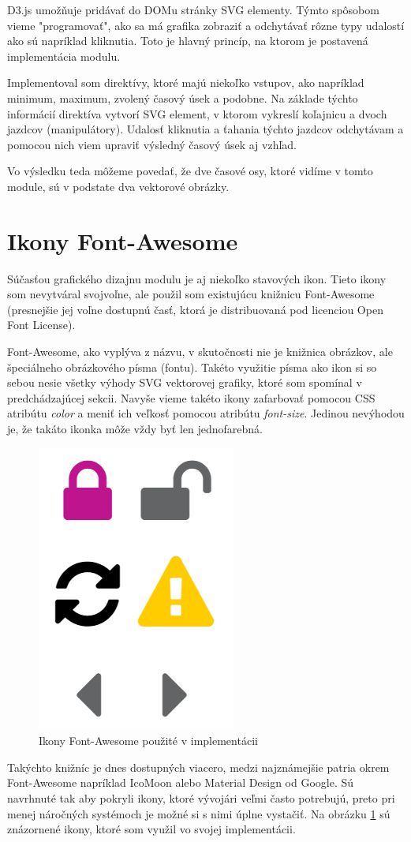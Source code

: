 \documentclass[
  digital, %
  twoside, %
  notable,   %
  nolof,   %
  nolot,   %
]{fithesis3}
\begin{document}
D3.js umožňuje pridávať do DOMu stránky SVG elementy. Týmto spôsobom vieme "programovať", ako sa má grafika zobraziť a odchytávať rôzne typy udalostí ako sú napríklad kliknutia. Toto je hlavný princíp, na ktorom je postavená implementácia modulu.

Implementoval som direktívy, ktoré majú niekoľko vstupov, ako napríklad minimum, maximum, zvolený časový úsek a podobne. Na základe týchto informácií direktíva vytvorí SVG element, v ktorom vykreslí koľajnicu a dvoch jazdcov (manipulátory). Udalosť kliknutia a ťahania týchto jazdcov odchytávam a pomocou nich viem upraviť výsledný časový úsek aj vzhľad.

Vo výsledku teda môžeme povedať, že dve časové osy, ktoré vidíme v tomto module, sú v podstate dva vektorové obrázky.

\section{Ikony Font-Awesome}
Súčasťou grafického dizajnu modulu je aj niekoľko stavových ikon. Tieto ikony som nevytváral svojvoľne, ale použil som existujúcu knižnicu Font-Awesome (presnejšie jej voľne dostupnú časť, ktorá je distribuovaná pod licenciou Open Font License).

Font-Awesome, ako vyplýva z názvu, v skutočnosti nie je knižnica obrázkov, ale špeciálneho obrázkového písma (fontu). Takéto využitie písma ako ikon si so sebou nesie všetky výhody SVG vektorovej grafiky, ktoré som spomínal v predchádzajúcej sekcii. Navyše vieme takéto ikony zafarbovať pomocou CSS atribútu \textit{color} a meniť ich veľkosť pomocou atribútu \textit{font-size}. Jedinou nevýhodou je, že takáto ikonka môže vždy byť len jednofarebná.

\begin{figure}
	\center
	\includegraphics[width=.25\linewidth]{icons}
	\caption{Ikony Font-Awesome použité v implementácii}
	\label{icons}
\end{figure}

Takýchto knižníc je dnes dostupných viacero, medzi najznámejšie patria okrem Font-Awesome napríklad IcoMoon alebo Material Design od Google. Sú navrhnuté tak aby pokryli ikony, ktoré vývojári veľmi často potrebujú, preto pri menej náročných systémoch je možné si s nimi úplne vystačiť. Na obrázku \ref{icons} sú znázornené ikony, ktoré som využil vo svojej implementácii.
\end{document}
